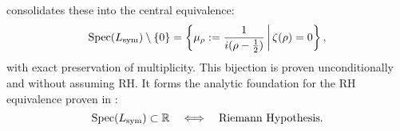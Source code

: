 \medskip

\noindent
{} consolidates these into the central equivalence:
\[
\operatorname{Spec}(L_{\mathrm{sym}}) \setminus \{0\} = \left\{ \mu_\rho := \frac{1}{i(\rho - \tfrac{1}{2})} \,\middle|\, \zeta(\rho) = 0 \right\},
\]
with exact preservation of multiplicity. This bijection is proven unconditionally and without assuming RH. It forms the analytic foundation for the RH equivalence proven in :
\[
\operatorname{Spec}(L_{\mathrm{sym}}) \subset \mathbb{R} \quad \Longleftrightarrow \quad \text{Riemann Hypothesis}.
\]
